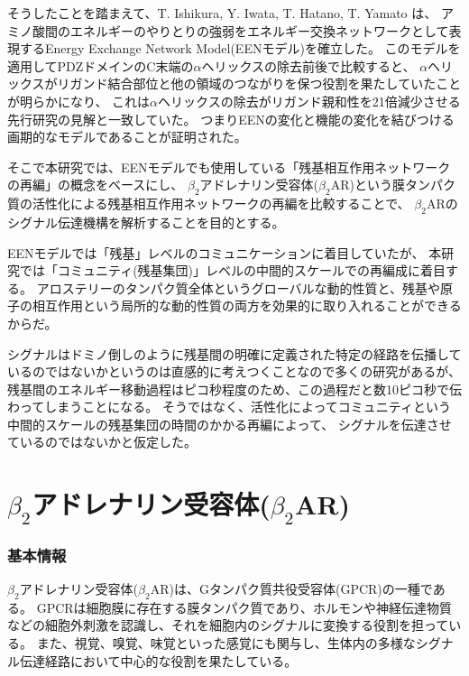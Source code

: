 そうしたことを踏まえて、T. Ishikura, Y. Iwata, T. Hatano, T. Yamato は、
アミノ酸間のエネルギーのやりとりの強弱をエネルギー交換ネットワークとして表現するEnergy Exchange Network Model(EENモデル)を確立\cite{Ishikura2015}した。
このモデルを適用してPDZドメインのC末端の$\alpha$ヘリックスの除去前後で比較すると、
$\alpha$ヘリックスがリガンド結合部位と他の領域のつながりを保つ役割を果たしていたことが明らかになり、
これは$\alpha$ヘリックスの除去がリガンド親和性を21倍減少させる先行研究の見解と一致していた。
つまりEENの変化と機能の変化を結びつける画期的なモデルであることが証明された。


そこで本研究では、EENモデルでも使用している「残基相互作用ネットワークの再編」の概念をベースにし、
$\beta_2$アドレナリン受容体($\beta_2$AR)という膜タンパク質の活性化による残基相互作用ネットワークの再編を比較することで、
$\beta_2$ARのシグナル伝達機構を解析することを目的とする。

EENモデルでは「残基」レベルのコミュニケーションに着目していたが、
本研究では「コミュニティ(残基集団)」レベルの中間的スケールでの再編成に着目する。
アロステリーのタンパク質全体というグローバルな動的性質と、残基や原子の相互作用という局所的な動的性質の両方を効果的に取り入れることができるからだ。

シグナルはドミノ倒しのように残基間の明確に定義された特定の経路を伝播しているのではないかというのは直感的に考えつくことなので多くの研究があるが、
残基間のエネルギー移動過程はピコ秒程度のため、この過程だと数10ピコ秒で伝わってしまうことになる。
そうではなく、活性化によってコミュニティという中間的スケールの残基集団の時間のかかる再編によって、
シグナルを伝達させているのではないかと仮定した。


\section{$\beta_2$アドレナリン受容体($\beta_2$AR)}
\label{sec:b2ar}

\subsubsection{基本情報}
$\beta_2$アドレナリン受容体($\beta_2$AR)は、Gタンパク質共役受容体(GPCR)の一種である。
GPCRは細胞膜に存在する膜タンパク質であり、ホルモンや神経伝達物質などの細胞外刺激を認識し、それを細胞内のシグナルに変換する役割を担っている。
また、視覚、嗅覚、味覚といった感覚にも関与し、生体内の多様なシグナル伝達経路において中心的な役割を果たしている。

